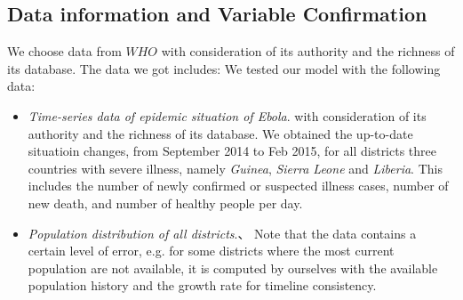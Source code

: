\documentclass[12pt,a4paper,titlepage]{article}
\begin{document}
\subsection{Data information and Variable Confirmation}
\label{section_database}
We choose data from $WHO$ with consideration of its authority and the richness of its database. The data we got includes:
We tested our model with the following data: 
\begin{itemize}
    \item \emph{Time-series data of epidemic situation of Ebola}. with consideration of its authority and the richness of its database. We obtained the up-to-date situatioin changes, from September 2014 to Feb 2015, for all districts \cite{ebolaDatabase20140204} three countries with severe illness, namely \emph{Guinea}, \emph{Sierra Leone} and \emph{Liberia}. This includes the number of newly confirmed or suspected illness cases, number of new death, and number of healthy people per day. 
    \item \emph{Population distribution of all districts}.、\cite{WMADatabase20140204} Note that the data contains a certain level of error, e.g. for some districts where the most current population are not available, it is computed by ourselves with the available population history and the growth rate for timeline consistency.
\end{itemize}
\end{document}
